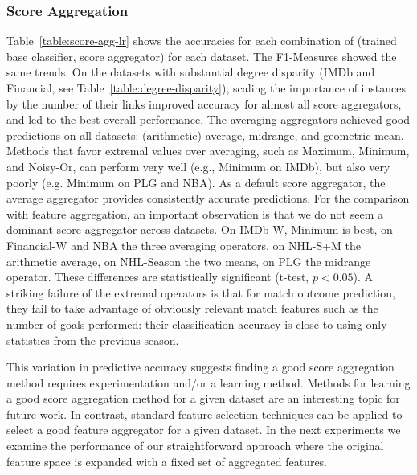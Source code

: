 \documentclass[conference]{IEEEtran}
\begin{document}
\subsubsection{Score Aggregation} Table~\ref{table:score-agg-lr} shows the accuracies for each combination of (trained base classifier, score aggregator) for each dataset. The F1-Measures showed the same trends. On the datasets with substantial degree disparity (IMDb and Financial, see Table~\ref{table:degree-disparity}), scaling the importance of instances by the number of their links improved accuracy for almost all score aggregators, and led to the best overall performance. The averaging aggregators achieved good predictions on all datasets: (arithmetic) average, midrange, and geometric mean. Methods that favor extremal values over averaging, such as Maximum, Minimum, and Noisy-Or, can perform very well (e.g., Minimum on IMDb), but also very poorly (e.g. Minimum on PLG and NBA). As a default score aggregator, the average aggregator provides consistently accurate predictions. For the comparison with feature aggregation, an important observation is that we do not seem a dominant score aggregator across datasets. On IMDb-W, Minimum is best, on Financial-W and NBA the three averaging operators, on NHL-S+M the arithmetic average, on NHL-Season the two means, on PLG the midrange operator. These differences are statistically significant (t-test, $p<0.05$). A striking failure of the extremal operators is that for match outcome prediction, they fail to take advantage of obviously relevant match features such as the number of goals performed: their classification accuracy is close to using only statistics from the previous season.

This variation in predictive accuracy suggests finding a good score aggregation method requires experimentation and/or a learning method. Methods for learning a good score aggregation method for a given dataset are an interesting topic for future work. In contrast, standard feature selection techniques can be applied to select a good feature aggregator for a given dataset. In the next experiments we examine the performance of our straightforward approach where the original feature space is expanded with a fixed set of aggregated features.


\end{document}
